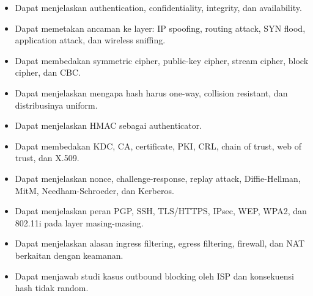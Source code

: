 \begin{itemize}
    \item Dapat menjelaskan authentication, confidentiality, integrity, dan availability.
    \item Dapat memetakan ancaman ke layer: IP spoofing, routing attack, SYN flood, application attack, dan wireless sniffing.
    \item Dapat membedakan symmetric cipher, public-key cipher, stream cipher, block cipher, dan CBC.
    \item Dapat menjelaskan mengapa hash harus one-way, collision resistant, dan distribusinya uniform.
    \item Dapat menjelaskan HMAC sebagai authenticator.
    \item Dapat membedakan KDC, CA, certificate, PKI, CRL, chain of trust, web of trust, dan X.509.
    \item Dapat menjelaskan nonce, challenge-response, replay attack, Diffie-Hellman, MitM, Needham-Schroeder, dan Kerberos.
    \item Dapat menjelaskan peran PGP, SSH, TLS/HTTPS, IPsec, WEP, WPA2, dan 802.11i pada layer masing-masing.
    \item Dapat menjelaskan alasan ingress filtering, egress filtering, firewall, dan NAT berkaitan dengan keamanan.
    \item Dapat menjawab studi kasus outbound blocking oleh ISP dan konsekuensi hash tidak random.
\end{itemize}
